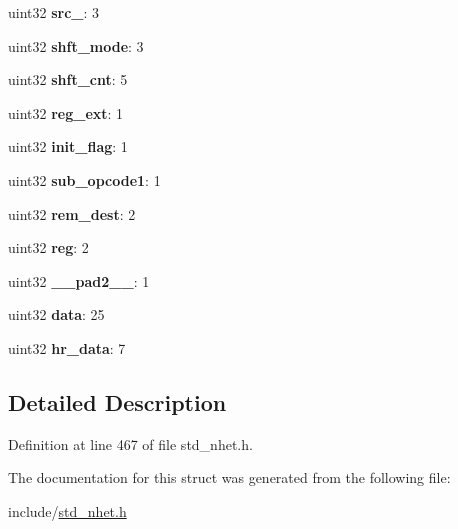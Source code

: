 \begin{DoxyCompactItemize}
\mbox{\label{structADD__format_a63cab81d371d0ae3fd7c59110117afc3}} 
uint32 {\bfseries src\+\_}\+: 3
\item 
\mbox{\label{structADD__format_a7a8ad806d505adf2f261b2708c58c287}} 
uint32 {\bfseries shft\+\_\+mode}\+: 3
\item 
\mbox{\label{structADD__format_a60bd45778edfeac46271777c0ed8a99c}} 
uint32 {\bfseries shft\+\_\+cnt}\+: 5
\item 
\mbox{\label{structADD__format_a3e611728be9787e57da9b94fa164e8a4}} 
uint32 {\bfseries reg\+\_\+ext}\+: 1
\item 
\mbox{\label{structADD__format_ab25e438b09b2881ea514b7b9fef249ce}} 
uint32 {\bfseries init\+\_\+flag}\+: 1
\item 
\mbox{\label{structADD__format_a9a863bf62de29e77625c43e1c4e49eff}} 
uint32 {\bfseries sub\+\_\+opcode1}\+: 1
\item 
\mbox{\label{structADD__format_a86462c82ada6486fe2f06652bbcfdda6}} 
uint32 {\bfseries rem\+\_\+dest}\+: 2
\item 
\mbox{\label{structADD__format_a1ecc72e677c3bfbcee39891f8e7a3c71}} 
uint32 {\bfseries reg}\+: 2
\item 
\mbox{\label{structADD__format_a899b9bf74ebe3200f39c8d9966645c07}} 
uint32 {\bfseries \+\_\+\+\_\+pad2\+\_\+\+\_\+}\+: 1
\item 
\mbox{\label{structADD__format_ac788418c1923996875102cd8a71560ce}} 
uint32 {\bfseries data}\+: 25
\item 
\mbox{\label{structADD__format_a3e2778e43049f38943961e358ac34c59}} 
uint32 {\bfseries hr\+\_\+data}\+: 7
\end{DoxyCompactItemize}


\subsection{Detailed Description}


Definition at line 467 of file std\+\_\+nhet.\+h.



The documentation for this struct was generated from the following file\+:\begin{DoxyCompactItemize}
\item 
include/\mbox{\hyperlink{std__nhet_8h}{std\+\_\+nhet.\+h}}\end{DoxyCompactItemize}
